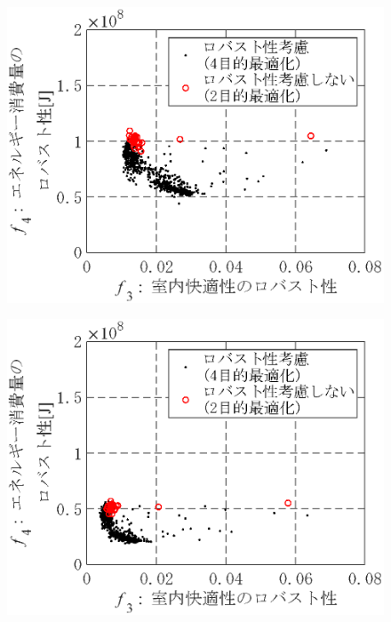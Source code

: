 \begin{figure}[htbp]
\begin{center}
\begin{minipage}{0.3\textwidth}
\begin{center}
            \end{center}
        \end{minipage}
        \begin{minipage}{0.3\textwidth}
            \begin{center}
                \includegraphics[width=1\textwidth,keepaspectratio=true]{fig/robust_result_pareto_f3f4_10_9.eps}\\\vspace{-3mm}{\small (i)下方誤差があった場合4}
            \end{center}
        \end{minipage}
        \begin{minipage}{0.3\textwidth}
            \begin{center}
                \includegraphics[width=1\textwidth,keepaspectratio=true]{fig/robust_result_pareto_f3f4_10_10.eps}\\\vspace{-3mm}{\small (j)下方誤差があった場合5}
            \end{center}
        \end{minipage}


\end{center}
\end{figure}
